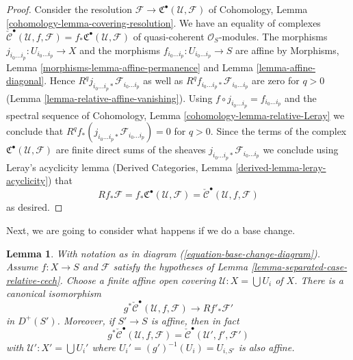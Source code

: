 \documentclass{stacks-project}
\theoremstyle{plain}
\newtheorem{lemma}[subsection]{Lemma}
\theoremstyle{definition}
\theoremstyle{remark}
\numberwithin{equation}{subsection}
\begin{document}
\begin{proof}
Consider the resolution
$\mathcal{F} \to {\mathfrak C}^\bullet(\mathcal{U}, \mathcal{F})$
of Cohomology, Lemma \ref{cohomology-lemma-covering-resolution}.
We have an equality of complexes
$\check{\mathcal{C}}^\bullet(\mathcal{U}, f, \mathcal{F}) =
f_*{\mathfrak C}^\bullet(\mathcal{U}, \mathcal{F})$
of quasi-coherent $\mathcal{O}_S$-modules.
The morphisms $j_{i_0 \ldots i_p} : U_{i_0 \ldots i_p} \to X$
and the morphisms $f_{i_0 \ldots i_p} : U_{i_0 \ldots i_p} \to S$
are affine by Morphisms, Lemma \ref{morphisms-lemma-affine-permanence}
and Lemma \ref{lemma-affine-diagonal}.
Hence $R^qj_{i_0 \ldots i_p *}\mathcal{F}_{i_0 \ldots i_p}$
as well as $R^qf_{i_0 \ldots i_p *}\mathcal{F}_{i_0 \ldots i_p}$
are zero for $q > 0$ (Lemma \ref{lemma-relative-affine-vanishing}).
Using $f \circ j_{i_0 \ldots i_p} = f_{i_0 \ldots i_p}$ and
the spectral sequence of
Cohomology, Lemma \ref{cohomology-lemma-relative-Leray}
we conclude that
$R^qf_*(j_{i_0 \ldots i_p *}\mathcal{F}_{i_0 \ldots i_p}) = 0$
for $q > 0$.
Since the terms of the complex
${\mathfrak C}^\bullet(\mathcal{U}, \mathcal{F})$ are finite direct
sums of the sheaves $j_{i_0 \ldots i_p *}\mathcal{F}_{i_0 \ldots i_p}$
we conclude using Leray's acyclicity lemma
(Derived Categories, Lemma \ref{derived-lemma-leray-acyclicity})
that
$$
Rf_* \mathcal{F} = f_*{\mathfrak C}^\bullet(\mathcal{U}, \mathcal{F}) =
\check{\mathcal{C}}^\bullet(\mathcal{U}, f, \mathcal{F})
$$
as desired.
\end{proof}

\noindent
Next, we are going to consider what happens if we do a base change.

\begin{lemma}
\label{lemma-base-change-complex}
With notation as in diagram (\ref{equation-base-change-diagram}).
Assume $f : X \to S$ and $\mathcal{F}$ satisfy the hypotheses of
Lemma \ref{lemma-separated-case-relative-cech}. Choose a finite
affine open covering $\mathcal{U} : X = \bigcup U_i$ of $X$.
There is a canonical isomorphism
$$
g^*\check{\mathcal{C}}^\bullet(\mathcal{U}, f, \mathcal{F})
\longrightarrow
Rf'_*\mathcal{F}'
$$
in $D^{+}(S')$. Moreover, if $S' \to S$ is affine, then in fact
$$
g^*\check{\mathcal{C}}^\bullet(\mathcal{U}, f, \mathcal{F})
=
\check{\mathcal{C}}^\bullet(\mathcal{U}', f', \mathcal{F}')
$$
with $\mathcal{U}' : X' = \bigcup U_i'$ where
$U_i' = (g')^{-1}(U_i) = U_{i, S'}$ is also affine.
\end{lemma}
\end{document}
